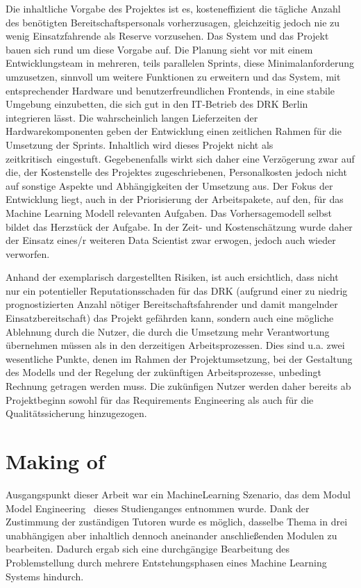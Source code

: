 Die inhaltliche Vorgabe des Projektes ist es, kosteneffizient die tägliche Anzahl des benötigten Bereitschaftspersonals vorherzusagen, gleichzeitig jedoch nie zu wenig Einsatzfahrende als Reserve vorzusehen. Das System und das Projekt bauen sich rund um diese Vorgabe auf. Die Planung sieht vor mit einem Entwicklungsteam in mehreren, teils parallelen Sprints, diese Minimalanforderung umzusetzen, sinnvoll um weitere Funktionen zu erweitern und das System, mit entsprechender Hardware und benutzerfreundlichen Frontends, in eine stabile Umgebung einzubetten, die sich gut in den IT-Betrieb des DRK Berlin integrieren lässt. Die wahrscheinlich langen Lieferzeiten der Hardwarekomponenten geben der Entwicklung einen zeitlichen Rahmen für die Umsetzung der Sprints. Inhaltlich wird dieses Projekt nicht als \glqq zeitkritisch\grqq\ eingestuft. Gegebenenfalls wirkt sich daher eine Verzögerung zwar auf die, der Kostenstelle des Projektes zugeschriebenen, Personalkosten jedoch nicht auf sonstige Aspekte und Abhängigkeiten der Umsetzung aus. Der Fokus der Entwicklung liegt, auch in der Priorisierung der Arbeitspakete, auf den, für das Machine Learning Modell relevanten Aufgaben. Das Vorhersagemodell selbst bildet das Herzstück der Aufgabe. In der Zeit- und Kostenschätzung wurde daher der Einsatz eines/r weiteren Data Scientist zwar erwogen, jedoch auch wieder verworfen. 

Anhand der exemplarisch dargestellten Risiken, ist auch ersichtlich, dass nicht nur ein potentieller Reputationsschaden für das DRK (aufgrund einer zu niedrig prognostizierten Anzahl nötiger Bereitschaftsfahrender und damit mangelnder Einsatzbereitschaft) das Projekt gefährden kann, sondern auch eine mögliche Ablehnung durch die Nutzer, die durch die Umsetzung mehr Verantwortung übernehmen müssen als in den derzeitigen Arbeitsprozessen. Dies sind u.a. zwei wesentliche Punkte, denen im Rahmen der Projektumsetzung, bei der Gestaltung des Modells und der Regelung der zukünftigen Arbeitsprozesse, unbedingt Rechnung getragen werden muss. Die zukünfigen Nutzer werden daher bereits ab Projektbeginn sowohl für das Requirements Engineering als auch für die Qualitätssicherung hinzugezogen. 




\section{Making of}

Ausgangspunkt dieser Arbeit war ein MachineLearning Szenario, das dem Modul \glqq Model Engineering\grqq\ \citep{pak_aufgabenstellung_dlmdwme01_2024} dieses Studienganges entnommen wurde. Dank der Zustimmung der zuständigen Tutoren wurde es möglich, dasselbe Thema in drei unabhängigen aber inhaltlich dennoch aneinander anschließenden Modulen zu bearbeiten. Dadurch ergab sich eine durchgängige Bearbeitung des Problemstellung durch mehrere Entstehungsphasen eines Machine Learning Systems hindurch. 

